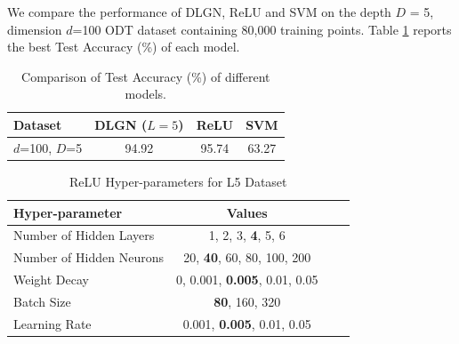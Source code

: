 \documentclass{article}
\theoremstyle{plain}
\theoremstyle{definition}
\theoremstyle{remark}
\newcommand{\1}{{\mathbf 1}}
\newcommand{\0}{{\mathbf 0}}
\renewcommand{\>}{{\rightarrow}}
\begin{document}
We compare the performance of DLGN, ReLU and SVM on the depth $D$ = 5, dimension $d$=100 ODT dataset containing 80,000 training points. Table \ref{tab:comparison} reports the best Test Accuracy (\%) of each model.


\begin{table}[h]
    \centering
    \caption{Comparison of Test Accuracy (\%) of different models.}
    \begin{tabular}{|l|c|c|c|}
        \hline
        \textbf{Dataset} & \textbf{DLGN} ($L=5$) & \textbf{ReLU} & \textbf{SVM} \\
        \hline
        $d$=100, $D$=5 & 94.92 & 95.74 & 63.27 \\
        \hline
    \end{tabular}
    \label{tab:comparison}
    \vspace{3 mm}
\end{table}

\begin{table}[h]
    \centering
    \caption{ReLU Hyper-parameters for L5 Dataset}    
    \begin{tabular}{|l|c|c|c|}
        \hline
        \textbf{Hyper-parameter} & \textbf{Values} \\
        \hline
        Number of Hidden Layers & 1, 2, 3, \textbf{4}, 5, 6\\
        Number of Hidden Neurons & 20, \textbf{40}, 60, 80, 100, 200\\
        Weight Decay & 0, 0.001, \textbf{0.005}, 0.01, 0.05\\
        Batch Size & \textbf{80}, 160, 320\\
        Learning Rate & 0.001, \textbf{0.005}, 0.01, 0.05\\
        \hline
    \end{tabular}
    \label{tab:relu5a}
\end{table}
\end{document}
